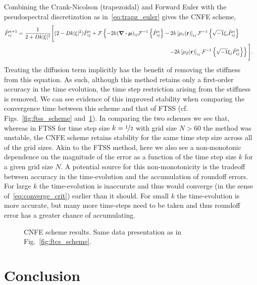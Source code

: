 \documentclass[11pt]{article}
\newcommand{\Phat}{\hat{P}}
\newcommand{\mF}{\mathcal{F}}
\newcommand{\mFi}{\mathcal{F}^{-1}}
\begin{document}
Combining the Crank-Nicolson (trapezoidal) and Forward Euler with the pseudospectral discretization as in~\eqref{eq:trapz_euler} gives the CNFE scheme,
\begin{align}
    \Phat_{ij}^{n+1} = \dfrac{1}{2+Dk|\xi|^{2}}\Bigg[
    (2-Dk|\xi|^{2})\Phat_{ij}^{n} 
    &+ \mF\left\{-2k(\div{\bm{\mu}})_{ij}\mFi\left\{\Phat_{ij}^{n}\right\}
    -2k\left[\mu_{1}(\vb{r})\right]_{ij}\mFi\left\{\sqrt{-1}\xi_{i}\Phat_{ij}^{n}\right\}\right. \nonumber\\
    &\hspace{5cm}\left. -2k\left[\mu_{2}(\vb{r})\right]_{ij}\mFi\left\{\sqrt{-1}\xi_{j}\Phat_{ij}^{n}\right\} \right\}
    \Bigg].\label{eq:cnfe_scheme}
\end{align}
Treating the diffusion term implicitly has the benefit of removing the stiffness from this equation. As such, although this method retains only a first-order accuracy in the time evolution, the time step restriction arising from the stiffness is removed. We can see evidence of this improved stability when comparing the convergence time between this scheme and that of FTSS (cf. Figs.~\ref{fig:ftss_scheme} and~\ref{fig:cnfe_scheme}). In comparing the two schemes we see that, whereas in FTSS for time step size $k = \nicefrac{1}{2}$ with grid size $N > 60$ the method was unstable, the CNFE scheme retains stability for the same time step size across all of the grid sizes. Akin to the FTSS method, here we also see a non-monotonic dependence on the magnitude of the error as a function of the time step size $k$ for a given grid size $N$. A potential source for this non-monotonicity is the tradeoff between accuracy in the time-evolution and the accumulation of roundoff errors. For large $k$ the time-evolution is inaccurate and thus would converge (in the sense of~\eqref{eq:converge_crit}) earlier than it should. For small $k$ the time-evolution is more accurate, but many more time-steps need to be taken and thus roundoff error has a greater chance of accumulating. 

\begin{figure}[!h]
    \centering
    \caption{CNFE scheme results. Same data presentation as in Fig.~\ref{fig:ftcs_scheme}.}
    \label{fig:cnfe_scheme}
\end{figure}

\section{Conclusion}
\end{document}
